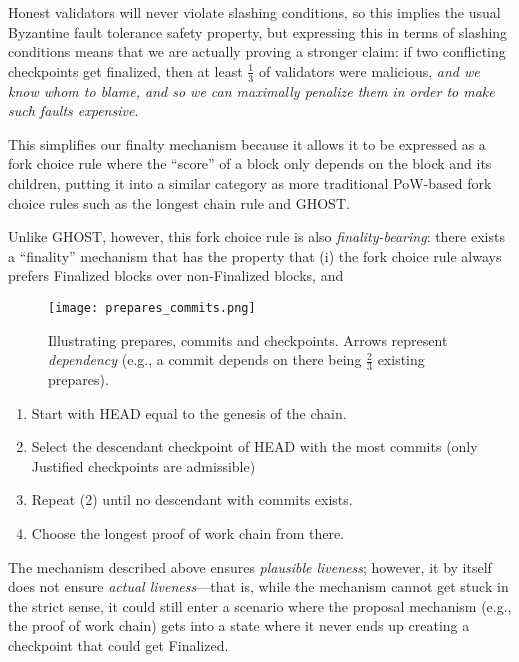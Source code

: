 Honest validators will never violate slashing conditions, so this implies the usual Byzantine fault tolerance safety property, but expressing this in terms of slashing conditions means that we are actually proving a stronger claim: if two conflicting checkpoints get finalized, then at least $\frac{1}{3}$ of validators were malicious, \textit{and we know whom to blame, and so we can maximally penalize them in order to make such faults expensive}.


This simplifies our finalty mechanism because it allows it to be expressed as a fork choice rule where the ``score'' of a block only depends on the block and its children, putting it into a similar category as more traditional PoW-based fork choice rules such as the longest chain rule and GHOST\cite{sompolinsky2013accelerating}.

Unlike GHOST, however, this fork choice rule is also \textit{finality-bearing}: there exists a ``finality'' mechanism that has the property that (i) the fork choice rule always prefers Finalized blocks over non-Finalized blocks, and

\begin{figure}[h!tb]
\centering
    \texttt{[image: prepares\_commits.png]}
    \caption{Illustrating prepares, commits and checkpoints. Arrows represent \textit{dependency} (e.g., a commit depends on there being $\frac{2}{3}$ existing prepares).}
    \label{fig:prepares_and_commits}
\end{figure}


\begin{enumerate}
\item Start with HEAD equal to the genesis of the chain.
\item Select the descendant checkpoint of HEAD with the most commits (only Justified checkpoints are admissible)
\item Repeat (2) until no descendant with commits exists.
\item Choose the longest proof of work chain from there.
\end{enumerate}


The mechanism described above ensures \textit{plausible liveness}; however, it by itself does not ensure \textit{actual liveness}---that is, while the mechanism cannot get stuck in the strict sense, it could still enter a scenario where the proposal mechanism (e.g., the proof of work chain) gets into a state where it never ends up creating a checkpoint that could get Finalized.


